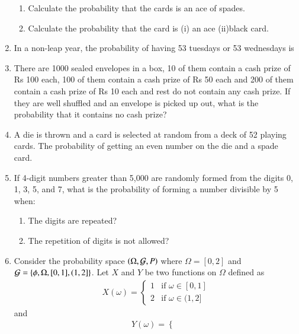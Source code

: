 \begin{enumerate}[label=\thesection.\arabic*,ref=\thesection.\theenumi]
\begin{enumerate}[label=(\alph*)]
\item Calculate the probability that the cards is an ace of spades.
\item Calculate the probability that the card is (i) an ace (ii)black card.\\
\end{enumerate}
%
\item In a non-leap year, the probability of having 53 tuesdays or 53 wednesdays is\\
\solution
%
\item There are 1000 sealed envelopes in a box, 10 of them contain a cash prize of
Rs 100 each, 100 of them contain a cash prize of Rs 50 each and 200 of them
contain a cash prize of Rs 10 each and rest do not contain any cash prize. If they
are well shuffled and an envelope is picked up out, what is the probability that it
contains no cash prize?\\
\solution
%
\item 
A die is thrown and a card is selected at random from a deck of 52 playing cards. The probability of getting an even number on the die and a spade card.\\
\solution
%
\item
If 4-digit numbers greater than 5,000 are randomly formed from the digits 0, 1, 3, 5, and 7, what is the probability of forming a number divisible by 5 when:
\begin{enumerate}
    \item The digits are repeated?
    \item The repetition of digits is not allowed?
\end{enumerate}
\solution
%
\item Consider the probability space $\left(\Omega, \mathcal{G}, P\right)$ where $\Omega = [0,2]$ and $\mathcal{G} = \left\{\phi, \Omega, [0,1], (1,2]\right\}$. Let $X$ and $Y$ be two functions on $\Omega$ defined as
\begin{align*}
    X(\omega) = 
    \begin{cases}
        1 & \text{if }\omega \in [0, 1]\\
        2 & \text{if }\omega \in (1, 2]
    \end{cases}
\end{align*}
and
\begin{align*}
    Y(\omega) = 
    \begin{cases}

\end{cases}
\end{align*}
\end{enumerate}
